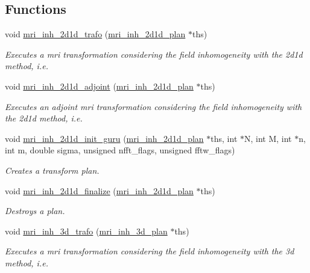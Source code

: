\subsection*{Functions}
\begin{CompactItemize}
\item 
void \hyperlink{group__mri_g0dad1c9466615a5791b5037ab2f85373}{mri\_\-inh\_\-2d1d\_\-trafo} (\hyperlink{structmri__inh__2d1d__plan}{mri\_\-inh\_\-2d1d\_\-plan} $\ast$ths)
\begin{CompactList}\small\item\em Executes a mri transformation considering the field inhomogeneity with the 2d1d method, i.e. \item\end{CompactList}\item 
void \hyperlink{group__mri_ge431fe3e0ef4dc056f58d827f804d0a4}{mri\_\-inh\_\-2d1d\_\-adjoint} (\hyperlink{structmri__inh__2d1d__plan}{mri\_\-inh\_\-2d1d\_\-plan} $\ast$ths)
\begin{CompactList}\small\item\em Executes an adjoint mri transformation considering the field inhomogeneity with the 2d1d method, i.e. \item\end{CompactList}\item 
void \hyperlink{group__mri_g8010f0f3bd86f3bd6516751b876e6b14}{mri\_\-inh\_\-2d1d\_\-init\_\-guru} (\hyperlink{structmri__inh__2d1d__plan}{mri\_\-inh\_\-2d1d\_\-plan} $\ast$ths, int $\ast$N, int M, int $\ast$n, int m, double sigma, unsigned nfft\_\-flags, unsigned fftw\_\-flags)
\begin{CompactList}\small\item\em Creates a transform plan. \item\end{CompactList}\item 
void \hyperlink{group__mri_gaa9aa7ca6642fde2d6926a6430149fa1}{mri\_\-inh\_\-2d1d\_\-finalize} (\hyperlink{structmri__inh__2d1d__plan}{mri\_\-inh\_\-2d1d\_\-plan} $\ast$ths)
\begin{CompactList}\small\item\em Destroys a plan. \item\end{CompactList}\item 
void \hyperlink{group__mri_gd95016880bd9ad2af3e59185c5312d99}{mri\_\-inh\_\-3d\_\-trafo} (\hyperlink{structmri__inh__3d__plan}{mri\_\-inh\_\-3d\_\-plan} $\ast$ths)
\begin{CompactList}\small\item\em Executes a mri transformation considering the field inhomogeneity with the 3d method, i.e. \item\end{CompactList}\item 

\end{CompactItemize}
